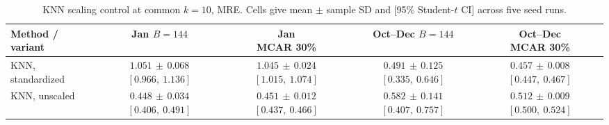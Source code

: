 \begin{table}[htbp]
\centering
\caption{{KNN scaling control at common $k=10$, MRE. Cells give mean $\pm$ sample SD and [95\% Student-$t$ CI] across five seed runs.}}
\label{tab:p03_A12}
\begingroup
\footnotesize
\setlength{\tabcolsep}{3pt}
\renewcommand{\arraystretch}{1.15}
\begin{tabular}{lcccc}
\toprule
Method / variant & \makecell{Jan\\$B=144$} & \makecell{Jan\\MCAR 30\%} & \makecell{Oct--Dec\\$B=144$} & \makecell{Oct--Dec\\MCAR 30\%} \\
\midrule
KNN, standardized & \makecell[c]{$1.051\,\pm\,0.068$\\$[0.966,\ 1.136]$} & \makecell[c]{$1.045\,\pm\,0.024$\\$[1.015,\ 1.074]$} & \makecell[c]{$0.491\,\pm\,0.125$\\$[0.335,\ 0.646]$} & \makecell[c]{$0.457\,\pm\,0.008$\\$[0.447,\ 0.467]$} \\
KNN, unscaled & \makecell[c]{$0.448\,\pm\,0.034$\\$[0.406,\ 0.491]$} & \makecell[c]{$0.451\,\pm\,0.012$\\$[0.437,\ 0.466]$} & \makecell[c]{$0.582\,\pm\,0.141$\\$[0.407,\ 0.757]$} & \makecell[c]{$0.512\,\pm\,0.009$\\$[0.500,\ 0.524]$} \\
\bottomrule
\end{tabular}
\endgroup
\end{table}

\clearpage

